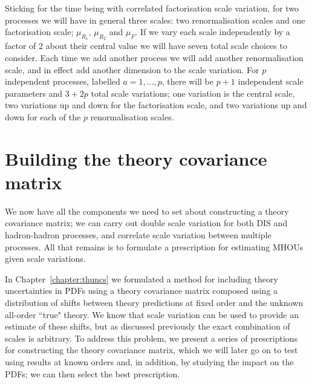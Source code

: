 Sticking for the time being with correlated factorisation scale variation, for two processes we will have in general three scales: two renormalisation scales and one factorisation scale; $\mu_{R_1}$, $\mu_{R_2}$ and $\mu_F$. If we vary each scale independently by a factor of 2 about their central value we will have seven total scale choices to consider. Each time we add another process we will add another renormalisation scale, and in effect add another dimension to the scale variation. For $p$ independent processes, labelled $a = 1, \ldots, p$, there will be $p+1$ independent scale parameters and $3 + 2p$ total scale variations; one variation is the central scale, two variations up and down for the factorisation scale, and two variations up and down for each of the $p$ renormalisation scales.
\section{Building the theory covariance matrix}
\label{sec:prescrip}
We now have all the components we need to set about constructing a theory covariance matrix; we can carry out double scale variation for both DIS and hadron-hadron processes, and correlate scale variation between multiple processes. All that remains is to formulate a prescription for estimating MHOUs given scale variations.

In Chapter~\ref{chapter:thuncs} we formulated a method for including theory uncertainties in PDFs using a theory covariance matrix composed using a distribution of shifts between theory predictions at fixed order and the unknown all-order ``true" theory. We know that scale variation can be used to provide an estimate of these shifts, but as discussed previously the exact combination of scales is arbitrary. To address this problem, we present a series of prescriptions for constructing the theory covariance matrix, which we will later go on to test using results at known orders and, in addition, by studying the impact on the PDFs; we can then select the best prescription.

